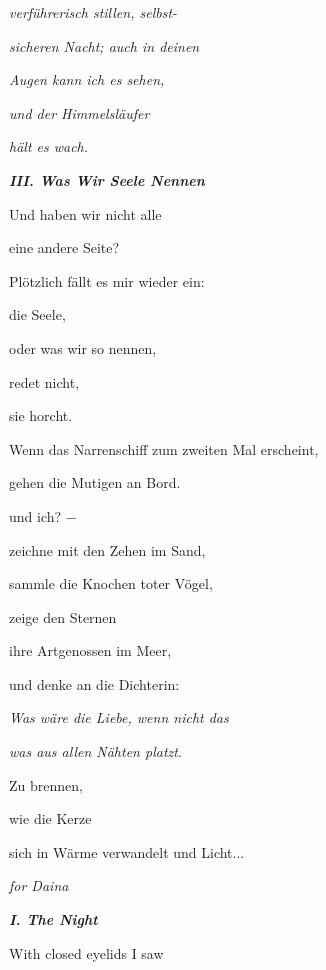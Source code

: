 \documentclass[a4paper]{article}
\begin{document}
{\itshape
verführerisch stillen, selbst-}

{\itshape
sicheren Nacht; auch in deinen}

{\itshape
Augen kann ich es sehen,}

{\itshape
und der Himmelsläufer}

{\itshape
hält es wach.}


\bigskip

{\bfseries\itshape
III. Was Wir Seele Nennen}


\bigskip

Und haben wir nicht alle

eine andere Seite?


\bigskip

Plötzlich fällt es mir wieder ein:

die Seele,

oder was wir so nennen,

redet nicht,

sie horcht.


\bigskip

Wenn das Narrenschiff zum zweiten Mal erscheint,

gehen die Mutigen an Bord. 

und ich? $-$


\bigskip

zeichne mit den Zehen im Sand,

sammle die Knochen toter Vögel,

zeige den Sternen 

ihre Artgenossen im Meer,


\bigskip

und denke an die Dichterin:

{\itshape
Was wäre die Liebe, wenn nicht das}

\textit{was aus allen Nähten platzt}.


\bigskip

Zu brennen,

wie die Kerze

sich in Wärme verwandelt und Licht...


\bigskip


\bigskip


{\itshape
for Daina}


\bigskip

{\bfseries\itshape
I. The Night}


\bigskip

With closed eyelids I saw
\end{document}
